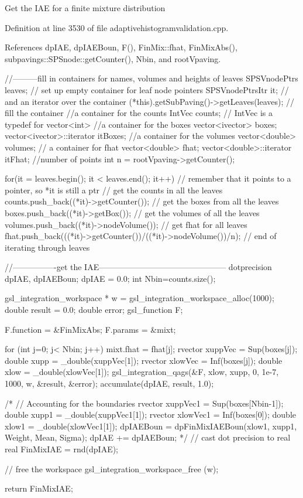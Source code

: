 \-Get the \-I\-A\-E for a finite mixture distribution 

\-Definition at line 3530 of file adaptivehistogramvalidation.\-cpp.



\-References dp\-I\-A\-E, dp\-I\-A\-E\-Boun, \-F(), \-Fin\-Mix\-::fhat, \-Fin\-Mix\-Abs(), subpavings\-::\-S\-P\-Snode\-::get\-Counter(), \-Nbin, and root\-Vpaving.


\begin{DoxyCode}
{
  //---------fill in containers for names, volumes and heights of leaves
  SPSVnodePtrs leaves; // set up empty container for leaf node pointers
  SPSVnodePtrsItr it; // and an iterator over the container
  (*this).getSubPaving()->getLeaves(leaves); // fill the container
  //a container for the counts
  IntVec counts;  // IntVec is a typedef for vector<int>
  //a container for the boxes
  vector<ivector> boxes; vector<ivector>::iterator itBoxes;
  //a container for the volumes
  vector<double> volumes;
  // a container for fhat
  vector<double> fhat; vector<double>::iterator itFhat;
  //number of points
  int n = rootVpaving->getCounter();
            
  for(it = leaves.begin(); it < leaves.end(); it++) {
    // remember that it points to a pointer, so *it is still a ptr
    // get the counts in all the leaves
     counts.push_back((*it)->getCounter());
     // get the boxes from all the leaves
     boxes.push_back((*it)->getBox());
     // get the volumes of all the leaves
     volumes.push_back((*it)->nodeVolume());
     // get fhat for all leaves
     fhat.push_back(((*it)->getCounter())/((*it)->nodeVolume())/n);
  } // end of iterating through leaves 
  
  //----------------get the IAE-----------------------------------------------
  dotprecision dpIAE, dpIAEBoun;
  dpIAE = 0.0;
  int Nbin=counts.size();
  
  gsl_integration_workspace * w = gsl_integration_workspace_alloc(1000);
  double result = 0.0;
  double error;
  gsl_function F;
  
  F.function = &FinMixAbs;
  F.params =  &mixt;
  
  for (int j=0; j< Nbin; j++){
    mixt.fhat = fhat[j];
    rvector xuppVec = Sup(boxes[j]);
    double xupp = _double(xuppVec[1]);
    rvector xlowVec = Inf(boxes[j]);
    double xlow = _double(xlowVec[1]);
    gsl_integration_qags(&F, xlow, xupp, 0, 1e-7, 1000, w, &result, &error);
    accumulate(dpIAE, result, 1.0);
  }
  
/*  // Accounting for the boundaries
  rvector xuppVec1 = Sup(boxes[Nbin-1]);
  double xupp1 = _double(xuppVec1[1]);
  rvector xlowVec1 = Inf(boxes[0]);
  double xlow1 = _double(xlowVec1[1]);
  dpIAEBoun = dpFinMixIAEBoun(xlow1, xupp1, Weight, Mean, Sigma);
  dpIAE += dpIAEBoun;
*/  
  // cast dot precision to real
  real FinMixIAE = rnd(dpIAE);
  
  // free the workspace
  gsl_integration_workspace_free (w);
  
  return FinMixIAE;
}
\end{DoxyCode}
